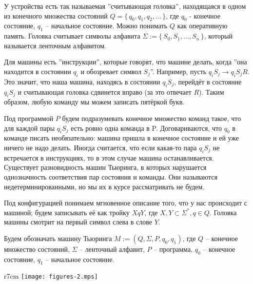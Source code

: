 \par У устройства есть так называемая ''считывающая головка'',  находящаяся в одном из конечного множества
состояний $Q = \{\,q_0, q_1, q_2,\ldots\,\}$, где $q_0$ - конечное состояние, $q_1$ -- начальное
состояние. Можно понимать $Q$ как оперативную память. Головка считывает символы алфавита $\Sigma := \{\,S_0,
S_1,\ldots,S_n\,\}$, который называется ленточным алфавитом. 
\par Для машины есть ''инструкции'', которые говорят, что машине делать, когда ''она находится в состоянии $q_{i}$
и обозревает символ $S_j$''. Например, пусть $q_{i}S_j \to q_{i}S_jR$. Это значит, что наша машина,
находясь в состоянии $q_{i}S_j$, перейдёт в состояние $q_{i}S_j$ и считывающая головка сдвинется вправо (за это
отвечает $R$). Таким образом, любую команду мы можем записать пятёркой букв. 
\par Под программой $P$ будем подразумевать конечное множество команд такое, что для каждой пары $q_{i}S_j$ есть
ровно одна команда в P. Договариваются, что $q_{0}$ в команде писать необязательно: машина пришла в конечное
состояние и ей уже ничего не надо делать. Иногда считается, что если какая-то пара $q_{i}S_j$ не встречается в
инструкциях, то в этом случае машина останавливается. Существует  разновидность машин Тьюринга, в которых
нарушается однозначность соответствия пар состояния и команды. Они называются недетерминированными, но мы их в
курсе рассматривать не будем.
\par Под конфигурацией понимаем мгновенное описание того, что у нас происходит с машиной; будем записывать её как
тройку $XqY$, где $X, Y \subset \Sigma^*, q \in Q$. Головка машины смотрит на первый символ слева в слове $Y$.
\par Будем обозначать машину Тьюринга $M:=(Q, \Sigma, P, q_0, q_1)$, где $Q$ -- конечное множество состояний,
$\Sigma$ -- ленточный алфавит, $P$ -- программа, $q_0$ -- конечное состояние, $q_1$ -- начальное состояние.
\begin{wrapfigure}{r}{7cm}
	\texttt{[image: figures-2.mps]}
\end{wrapfigure}
